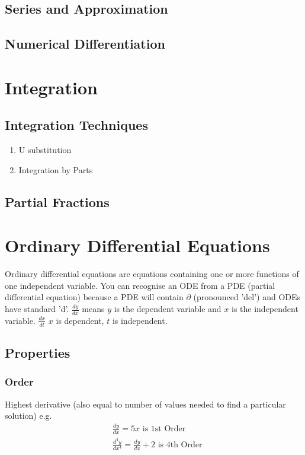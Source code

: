 \documentclass[12pt] {article}
\begin{document}
\subsection*{Series and Approximation}
\subsection*{Numerical Differentiation}
\section{Integration}
\subsection*{Integration Techniques}
\begin{enumerate}
  \item U substitution 
  \item Integration by Parts
\end{enumerate}
\subsection*{Partial Fractions}

\section{Ordinary Differential Equations}
Ordinary differential equations are equations containing one or more functions of one independent variable. 
You can recognise an ODE from a PDE (partial differential equation) because a PDE will contain $\partial$ (pronounced 'del')
and ODEs have standard 'd'. $\frac{dy}{dx}$ means $y$ is the dependent variable and $x$ is the independent variable. $\frac{dx}{dt}$ $x$ is dependent, $t$ is independent.

\subsection*{Properties}
\subsubsection*{Order}
Highest derivative (also equal to number of values needed to find a particular solution) e.g.
\begin{align*}
    &\frac{dy}{dx} = 5x \text{ is 1st Order} \\
    &\frac{d^4y}{dx^4} = \frac{dy}{dx} + 2 \text{ is 4th Order} \\
\end{align*}
\end{document}

